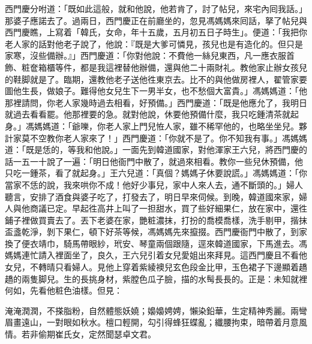 西門慶分咐道：「既如此這般，就和他說，他若肯了，討了帖兒，來宅內囘我話。」那婆子應諾去了。過兩日，西門慶正在前廳坐的，忽見馮媽媽來囘話，拏了帖兒與西門慶瞧，上寫着「韓氏，女命，年十五歲，五月初五日子時生」。便道：「我把你老人家的話對他老子說了，他說：『既是大爹可憐見，孩兒也是有造化的。但只是家寒，沒些備辦。』」西門慶道：「你對他說：不費他一絲兒東西，凡一應衣服首飾、粧奩箱櫃等件，都是我這裡替他辦備，還與他二十兩財礼。教他家止辦女孩兒的鞋脚就是了。臨期，還教他老子送他徃東京去。比不的與他做房裡人，翟管家要圖他生長，做娘子。難得他女兒生下一男半女，也不愁個大富貴。」馮媽媽道：「他那裡請問，你老人家幾時過去相看，好預備。」西門慶道：「既是他應允了，我明日就過去看看罷。他那裡要的急。就對他說，休要他預備什麼，我只吃鍾清茶就起身。」馮媽媽道：「爺嚛，你老人家上門兒恠人家，雖不稀罕他的，也略坐坐兒。夥計家莫不空教你老人家來了！」西門慶道：「你就不是了。你不知我有事。」馮媽媽道：「既是恁的，等我和他說。」一面先到韓道國家，對他渾家王六兒，將西門慶的話一五一十說了一遍：「明日他衙門中散了，就過來相看。教你一些兒休預備，他只吃一鍾茶，看了就起身。」王六兒道：「真個？媽媽子休要說謊。」馮媽媽道：「你當家{}不恁的說，我來哄你不成！他好少事兒，家中人來人去，通不斷頭的。」婦人聽言，安排了酒食與婆子吃了，打發去了，明日早來伺候。到晚，韓道國來家，婦人與他商議已定。早起徃高井上叫了一担甜水，買了些好細果仁，放在家中，還徃鋪子裡做買賣去了。丟下老婆在家，{}艷粧濃抹，打扮的喬模喬樣，洗手剔甲，揩抹盃盞乾淨，剝下果仁，頓下好茶等候，馮媽媽先來攛掇。西門慶衙門中散了，到家換了便衣靖巾，騎馬帶眼紗，玳安、琴童兩個跟隨，逕來韓道國家，下馬進去。馮媽媽連忙請入裡面坐了，良久，王六兒引着女兒愛姐出來拜見。這西門慶且不看他女兒，不轉晴只看婦人。見他上穿着紫綾襖兒玄色段金比甲，玉色裙子下邊顯着趫趫的兩隻脚兒。生的長挑身材，紫膛色瓜子臉，描的水髩長長的。{}正是：未知就裡何如，先看他粧色油樣。但見：

淹淹潤潤，不搽脂粉，自然體態妖嬈；嬝嬝娉娉，懶染鉛華，生定精神秀麗。兩彎眉畫遠山，一對眼如秋水。檀口輕開，勾引得蜂狂蝶亂；纖腰拘束，暗帶着月意風情。若非偷期崔氏女，定然聞瑟卓文君。

